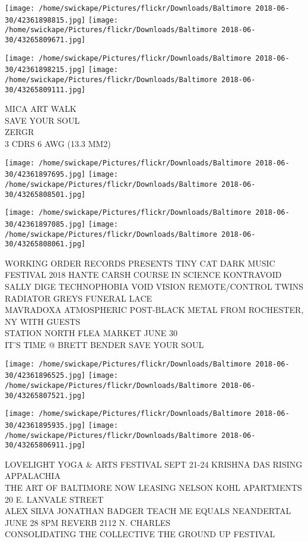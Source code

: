 \documentclass[10pt,letterpaper]{article}
\begin{document}
\texttt{[image: /home/swickape/Pictures/flickr/Downloads/Baltimore 2018-06-30/42361898815.jpg]}
\texttt{[image: /home/swickape/Pictures/flickr/Downloads/Baltimore 2018-06-30/43265809671.jpg]}

\texttt{[image: /home/swickape/Pictures/flickr/Downloads/Baltimore 2018-06-30/42361898215.jpg]}
\texttt{[image: /home/swickape/Pictures/flickr/Downloads/Baltimore 2018-06-30/43265809111.jpg]}

MICA ART WALK\\
SAVE YOUR SOUL\\
ZERGR\\
3 CDRS 6 AWG (13.3 MM2)\\
\pagebreak

\texttt{[image: /home/swickape/Pictures/flickr/Downloads/Baltimore 2018-06-30/42361897695.jpg]}
\texttt{[image: /home/swickape/Pictures/flickr/Downloads/Baltimore 2018-06-30/43265808501.jpg]}

\texttt{[image: /home/swickape/Pictures/flickr/Downloads/Baltimore 2018-06-30/42361897085.jpg]}
\texttt{[image: /home/swickape/Pictures/flickr/Downloads/Baltimore 2018-06-30/43265808061.jpg]}

WORKING ORDER RECORDS PRESENTS TINY CAT DARK MUSIC FESTIVAL 2018 HANTE CARSH COURSE IN SCIENCE KONTRAVOID SALLY DIGE TECHNOPHOBIA VOID VISION REMOTE/CONTROL TWINS RADIATOR GREYS FUNERAL LACE\\
MAVRADOXA ATMOSPHERIC POST{-}BLACK METAL FROM ROCHESTER, NY WITH GUESTS\\
STATION NORTH FLEA MARKET JUNE 30\\
IT'S TIME @ BRETT BENDER SAVE YOUR SOUL\\
\pagebreak

\texttt{[image: /home/swickape/Pictures/flickr/Downloads/Baltimore 2018-06-30/42361896525.jpg]}
\texttt{[image: /home/swickape/Pictures/flickr/Downloads/Baltimore 2018-06-30/43265807521.jpg]}

\texttt{[image: /home/swickape/Pictures/flickr/Downloads/Baltimore 2018-06-30/42361895935.jpg]}
\texttt{[image: /home/swickape/Pictures/flickr/Downloads/Baltimore 2018-06-30/43265806911.jpg]}

LOVELIGHT YOGA \& ARTS FESTIVAL SEPT 21{-}24 KRISHNA DAS RISING APPALACHIA\\
THE ART OF BALTIMORE NOW LEASING NELSON KOHL APARTMENTS 20 E. LANVALE STREET\\
ALEX SILVA JONATHAN BADGER TEACH ME EQUALS NEANDERTAL JUNE 28 8PM REVERB 2112 N. CHARLES\\
CONSOLIDATING THE COLLECTIVE THE GROUND UP FESTIVAL\\
\pagebreak
\end{document}
